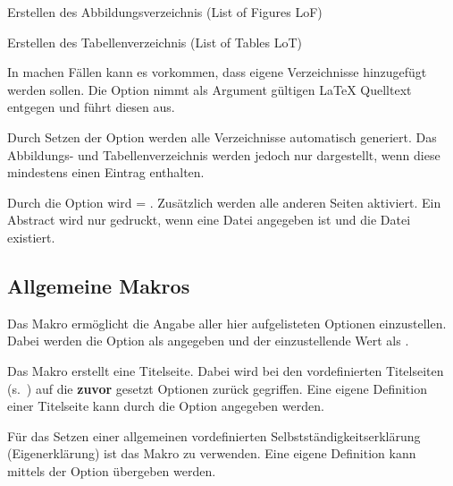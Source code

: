 \documentclass[babel=ngerman,highlight=false]{skdoc}
\begin{document}
                Erstellen des Abbildungsverzeichnis (List of Figures LoF)
                \medskip
                
                Erstellen des Tabellenverzeichnis (List of Tables LoT)
                \medskip
                
                In machen Fällen kann es vorkommen, dass eigene Verzeichnisse hinzugefügt werden sollen. Die Option  nimmt als Argument gültigen \LaTeX{} Quelltext entgegen und führt diesen aus.\medskip
                
                Durch Setzen der Option werden alle Verzeichnisse automatisch generiert. Das Abbildungs- und Tabellenverzeichnis werden jedoch nur dargestellt, wenn diese mindestens einen Eintrag enthalten.
                \medskip
                
                Durch die Option wird  = . Zusätzlich werden alle anderen Seiten aktiviert. Ein Abstract wird nur gedruckt, wenn eine Datei angegeben ist und die Datei existiert.
                \medskip

        \subsection{Allgemeine Makros}\label{subsec:macro}
            \DescribeMacro{} Das Makro ermöglicht die Angabe aller hier aufgelisteten Optionen einzustellen. Dabei werden die Option als  angegeben und der einzustellende Wert als .

            \DescribeMacro\dhbwtitlepage{} Das Makro erstellt eine Titelseite. Dabei wird bei den vordefinierten Titelseiten (s.~) auf die \textbf{zuvor} gesetzt Optionen zurück gegriffen. Eine eigene Definition einer Titelseite kann durch die Option  angegeben werden.

            \DescribeMacro\dhbwdeclaration{} Für das Setzen einer allgemeinen vordefinierten Selbstständigkeitserklärung (Eigenerklärung) ist das Makro zu verwenden. Eine eigene Definition kann mittels der Option  übergeben werden.
            
\end{document}
